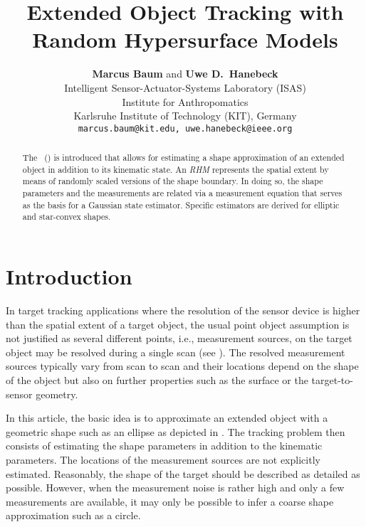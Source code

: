 \documentclass[preprint,1p,11pt]{ISAS_IR}
\newcommand{\placeFig}[1]{}
\begin{document}
\begin{frontmatter}

\title{Extended Object Tracking with \\Random Hypersurface Models}
\author{\textbf{Marcus Baum} and \textbf{Uwe D.~Hanebeck}\\
Intelligent Sensor-Actuator-Systems Laboratory (ISAS)\\
Institute for Anthropomatics\\
Karlsruhe Institute of Technology (KIT), Germany\\
{\tt marcus.baum@kit.edu, \tt uwe.hanebeck@ieee.org}
}
\begin{abstract}
The \RHM\ (\rhm) is introduced that allows for  estimating a shape approximation of an extended object in addition to its  kinematic state. An \emph{RHM} represents the spatial extent by means of randomly scaled versions of the shape boundary.  In doing so,  the shape parameters and the measurements are related via a measurement equation that serves as the basis for a  Gaussian state estimator. Specific estimators  are derived for elliptic and star-convex shapes.
\end{abstract}
\end{frontmatter}



















 

\chapter{Introduction}\label{sec:intro}
In target tracking applications \cite{Bar-Shalom2002} where the resolution of  the  sensor device is higher than the spatial extent of a target object, the usual point object assumption is not justified as 
several different points, i.e., measurement sources, on the target object may  be  resolved during a  single scan (see ). The resolved measurement sources typically vary from scan to scan and their locations  depend on the shape of the object but also on further  properties such as  the surface or the target-to-sensor geometry.
\placeFig{1} 
In this article, the  basic idea is to approximate an extended object with a geometric shape such as an ellipse \cite{Gilholm2005,Koch2008,Fusion10_BaumNoack} as depicted in .
The tracking problem then consists of estimating the  shape parameters in addition to the kinematic parameters.
The locations of the measurement sources are not explicitly estimated.
Reasonably, the shape of the target should be described as detailed as possible. However, when the measurement noise is rather high  and only a few measurements are available, it may only be possible to infer a  coarse shape approximation such as a circle.  
\end{document}
